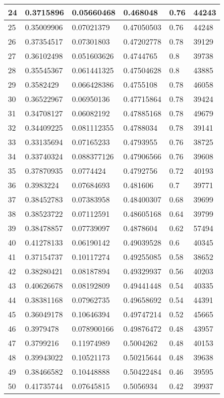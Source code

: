 \begin{longtable}{|l|l|l|l|l|l|}
24 & 0.3715896 & 0.05660468 & 0.468048 & 0.76 & 44243 \\ \hline 
25 & 0.35009906 & 0.07021379 & 0.47050503 & 0.76 & 44248 \\ \hline 
26 & 0.37354517 & 0.07301803 & 0.47202778 & 0.78 & 39129 \\ \hline 
27 & 0.36102498 & 0.051603626 & 0.4744765 & 0.8 & 39738 \\ \hline 
28 & 0.35545367 & 0.061441325 & 0.47504628 & 0.8 & 43885 \\ \hline 
29 & 0.3582429 & 0.066428386 & 0.4755108 & 0.78 & 46058 \\ \hline 
30 & 0.36522967 & 0.06950136 & 0.47715864 & 0.78 & 39424 \\ \hline 
31 & 0.34708127 & 0.06082192 & 0.47885168 & 0.78 & 49679 \\ \hline 
32 & 0.34409225 & 0.081112355 & 0.4788034 & 0.78 & 39141 \\ \hline 
33 & 0.33135694 & 0.07165233 & 0.4793955 & 0.76 & 38725 \\ \hline 
34 & 0.33740324 & 0.088377126 & 0.47906566 & 0.76 & 39608 \\ \hline 
35 & 0.37870935 & 0.0774424 & 0.4792756 & 0.72 & 40193 \\ \hline 
36 & 0.3983224 & 0.07684693 & 0.481606 & 0.7 & 39771 \\ \hline 
37 & 0.38452783 & 0.07383958 & 0.48400307 & 0.68 & 39699 \\ \hline 
38 & 0.38523722 & 0.07112591 & 0.48605168 & 0.64 & 39799 \\ \hline 
39 & 0.38478857 & 0.07739097 & 0.4878604 & 0.62 & 57494 \\ \hline 
40 & 0.41278133 & 0.06190142 & 0.49039528 & 0.6 & 40345 \\ \hline 
41 & 0.37154737 & 0.10117274 & 0.49255085 & 0.58 & 38652 \\ \hline 
42 & 0.38280421 & 0.08187894 & 0.49329937 & 0.56 & 40203 \\ \hline 
43 & 0.40626678 & 0.08192809 & 0.49441448 & 0.54 & 40335 \\ \hline 
44 & 0.38381168 & 0.07962735 & 0.49658692 & 0.54 & 44391 \\ \hline 
45 & 0.36049178 & 0.10646394 & 0.49747214 & 0.52 & 45665 \\ \hline 
46 & 0.3979478 & 0.078900166 & 0.49876472 & 0.48 & 43957 \\ \hline 
47 & 0.3799216 & 0.11974989 & 0.5004262 & 0.48 & 40153 \\ \hline 
48 & 0.39943022 & 0.10521173 & 0.50215644 & 0.48 & 39638 \\ \hline 
49 & 0.38466582 & 0.10448888 & 0.50422484 & 0.46 & 39595 \\ \hline 
50 & 0.41735744 & 0.07645815 & 0.5056934 & 0.42 & 39937 \\ \hline 
\end{longtable}